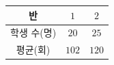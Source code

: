 {\renewcommand{\arraystretch}{1.35}\small
\begin{tabular}{|c|c|c|}
\hline
반 & $1$ & $2$ \\ \hline
학생 수(명) & $20$ & $25$ \\ \hline
평균(회) & $102$ & $120$ \\ \hline
\end{tabular}}
